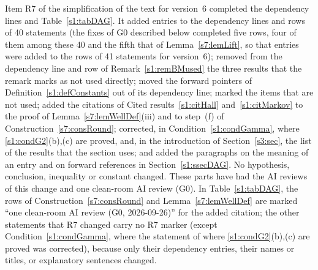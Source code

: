 \begin{remark}
\begin{enumerate}
Item R7 of the simplification of the text for version~6 completed the
dependency lines and Table~\ref{s1:tabDAG}. It added entries to the dependency
lines and rows of 40 statements (the fixes of G0 described below completed five
rows, four of them among these 40 and the fifth that of
Lemma~\ref{s7:lemLift}, so that entries were added to the rows of 41 statements
for version~6); removed from the dependency line and row of
Remark~\ref{s1:remBMused} the three results that the remark marks as not used
directly; moved the forward pointers of Definition~\ref{s1:defConstants} out of
its dependency line; marked the items that are not used; added the citations of Cited
results~\ref{s1:citHall} and~\ref{s1:citMarkov} to the proof of
Lemma~\ref{s7:lemWellDef}(iii) and to step~(f) of
Construction~\ref{s7:consRound}; corrected, in Condition~\ref{s1:condGamma},
where \ref{s1:condG2}(b),(c) are proved, and, in the introduction of
Section~\ref{s3:sec}, the list of the results that the section uses; and added
the paragraphs on the meaning of an entry and on forward references in
Section~\ref{s1:ssecDAG}. No hypothesis, conclusion, inequality or constant
changed. These parts have had the AI reviews of this change and one
clean-room AI review (G0). In Table~\ref{s1:tabDAG}, the rows of
Construction~\ref{s7:consRound} and Lemma~\ref{s7:lemWellDef} are marked ``one
clean-room AI review (G0, 2026-09-26)'' for the added citation; the other
statements that R7 changed carry no R7 marker (except
Condition~\ref{s1:condGamma}, where the statement of where
\ref{s1:condG2}(b),(c) are proved was corrected), because only their dependency
entries, their names or titles, or explanatory sentences changed.


\end{enumerate}
\end{remark}
